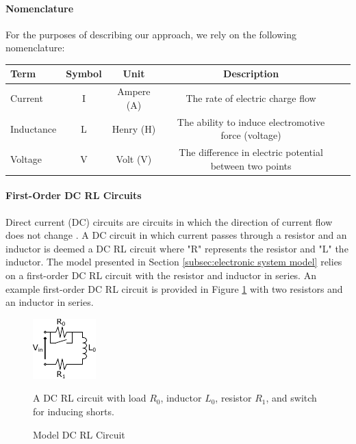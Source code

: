\paragraph{Nomenclature}
For the purposes of describing our approach, we rely on the following nomenclature:

\begin{center}
\bgroup
\def\arraystretch{1.0}%
\begin{tabular}{| l | c | c | c | l |}
    \hline
    Term & Symbol & Unit & Description\\  \hline \hline \cline{1-4}
    Current & I & Ampere (A) & The rate of electric charge flow \\ \cline{1-4}
    Inductance & L & Henry (H) & The ability to induce electromotive force (voltage)\\ \cline{1-4}
    Voltage & V & Volt (V) & The difference in electric potential between two points\\ \cline{1-4}
    \hline  
\end{tabular}
\egroup
\end{center}

\paragraph{First-Order DC RL Circuits}
Direct current (DC) circuits are circuits in which the direction of current flow does not change \cite{young_sears_2012}. A DC circuit in which current passes through a resistor and an inductor is deemed a DC RL circuit where "R" represents the resistor and "L" the inductor. The model presented in Section \ref{subsec:electronic system model} relies on a first-order DC RL circuit with the resistor and inductor in series. An example first-order DC RL circuit is provided in Figure \ref{fig:ModelDCRL} with two resistors and an inductor in series.
\begin{figure}
    \centering
    \includegraphics[width=0.25\linewidth]{fig/Model_DC_RL_Circuit_General.pdf}
    \caption{Model DC RL Circuit} A DC RL circuit with load $R_0$, inductor $L_0$, resistor $R_1$, and switch for inducing shorts.
    \label{fig:ModelDCRL}
\end{figure}
